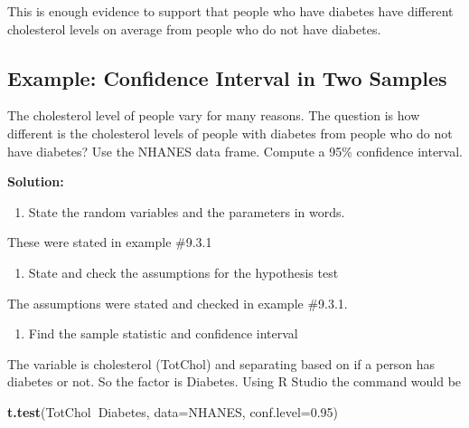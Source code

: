 \documentclass[]{book}
\newenvironment{Shaded}{\begin{snugshade}}{\end{snugshade}}
\newcommand{\DataTypeTok}[1]{\textcolor[rgb]{0.13,0.29,0.53}{#1}}
\newcommand{\FloatTok}[1]{\textcolor[rgb]{0.00,0.00,0.81}{#1}}
\newcommand{\KeywordTok}[1]{\textcolor[rgb]{0.13,0.29,0.53}{\textbf{#1}}}
\newcommand{\NormalTok}[1]{#1}
\newcommand{\OperatorTok}[1]{\textcolor[rgb]{0.81,0.36,0.00}{\textbf{#1}}}
\providecommand{\tightlist}{%
  \setlength{\itemsep}{0pt}\setlength{\parskip}{0pt}}
\begin{document}
This is enough evidence to support that people who have diabetes have different cholesterol levels on average from people who do not have diabetes.

\hypertarget{example-confidence-interval-in-two-samples}{%
\subsection{Example: Confidence Interval in Two Samples}\label{example-confidence-interval-in-two-samples}}

The cholesterol level of people vary for many reasons. The question is how different is the cholesterol levels of people with diabetes from people who do not have diabetes? Use the NHANES data frame. Compute a 95\% confidence interval.

\textbf{Solution:}

\begin{enumerate}
\def\labelenumi{\arabic{enumi}.}
\tightlist
\item
  State the random variables and the parameters in words.
\end{enumerate}

These were stated in example \#9.3.1

\begin{enumerate}
\def\labelenumi{\arabic{enumi}.}
\setcounter{enumi}{1}
\tightlist
\item
  State and check the assumptions for the hypothesis test
\end{enumerate}

The assumptions were stated and checked in example \#9.3.1.

\begin{enumerate}
\def\labelenumi{\arabic{enumi}.}
\setcounter{enumi}{2}
\tightlist
\item
  Find the sample statistic and confidence interval
\end{enumerate}

The variable is cholesterol (TotChol) and separating based on if a person has diabetes or not. So the factor is Diabetes. Using R Studio the command would be

\begin{Shaded}
\begin{Highlighting}[]
\KeywordTok{t.test}\NormalTok{(TotChol}\OperatorTok{~}\NormalTok{Diabetes, }\DataTypeTok{data=}\NormalTok{NHANES, }\DataTypeTok{conf.level=}\FloatTok{0.95}\NormalTok{)}
\end{Highlighting}
\end{Shaded}
\end{document}
